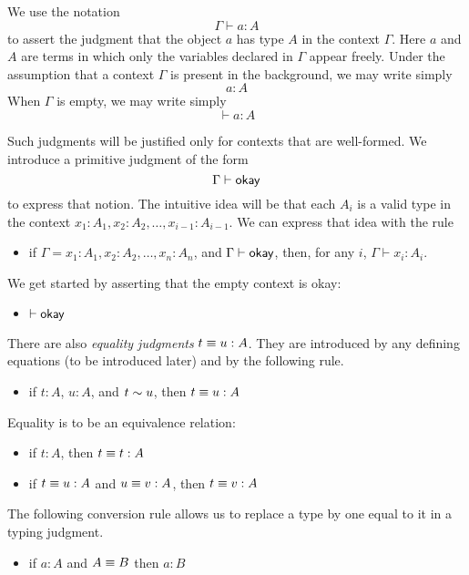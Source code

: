We use the notation
\[
  \Gamma \vdash a:A
\]
to assert the judgment that the object $a$ has type $A$ in the context
$\Gamma$.  Here $a$ and $A$ are terms in which only the variables declared in
$\Gamma$ appear freely.  Under the assumption that a context $\Gamma$ is
present in the background, we may write simply
\[
  a:A
\]
When $\Gamma$ is empty, we may write simply
\[
  \vdash a:A
\]

Such judgments will be justified only for contexts that are well-formed.  We
introduce a primitive judgment of the form
\[
  \Gamma \vdash \mathop{\textsf{okay}}
\]
to express that notion.  The intuitive idea will be that each $A_i$ is a valid
type in the context $x_1:A_1, x_2:A_2,\dots,x_{i-1}:A_{i-1}$.  We can express that idea with 
the rule

\begin{itemize}
\item if $\Gamma =  x_1:A_1, x_2:A_2,\dots,x_n:A_n$, and $\Gamma \vdash \mathop{\textsf{okay}}$, then, for any $i$, $\Gamma \vdash x_i : A_i$.
\end{itemize}

We get started by asserting that the empty context is okay:

\begin{itemize}
\item $\vdash \mathop{\textsf{okay}}$
\end{itemize}

There are also {\em equality judgments} $t \equiv u : A$.  They are introduced
by any defining equations (to be introduced later) and by the following rule.

\begin{itemize}
\item if $t:A$, $u:A$, and $t \sim u$, then $t \equiv u : A$
\end{itemize}

Equality is to be an equivalence relation:

\begin{itemize}
\item if $t:A$, then $t \equiv t : A$
\item if $t \equiv u : A$ and $u \equiv v : A$, then $t \equiv v : A$
\end{itemize}

The following conversion rule allows us to replace a type by one equal to it in
a typing judgment.

\begin{itemize}
\item if $a:A$ and $A \equiv B$ then $a:B$
\end{itemize}

